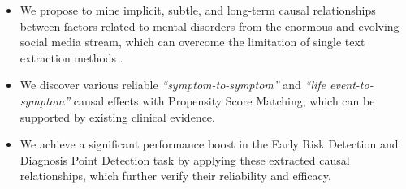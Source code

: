 \begin{itemize}
    \item We propose to mine implicit, subtle, and long-term causal relationships between factors related to mental disorders from the enormous and evolving social media stream, which can overcome the limitation of single text extraction methods \cite{garg2022cams}.

    \item We discover various reliable \textit{``symptom-to-symptom''} and \textit{``life event-to-symptom''} causal effects with Propensity Score Matching, which can be supported by existing clinical evidence.

    \item We achieve a significant performance boost in the Early Risk Detection and Diagnosis Point Detection task by applying these extracted causal relationships, which further verify their reliability and efficacy.
\end{itemize}



